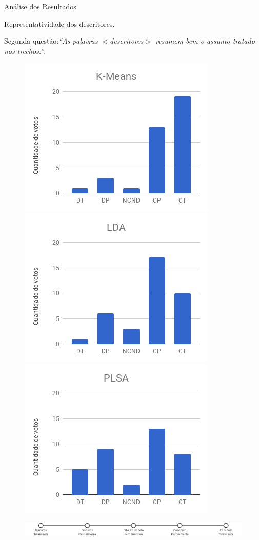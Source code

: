 \documentclass[xcolor=dvipsnames]{beamer}
\begin{document}
\begin{frame}{Análise dos Resultados}

	Representatividade dos descritores.

	Segunda questão:\textit{``As palavras \textit{$<$descritores$>$} resumem bem o assunto tratado nos trechos.''}.
\begin{figure}[!h] \centering     %

	\includegraphics[width=.31\textwidth]{images/figuras-experimento/Q2-KMeans.png}
	\includegraphics[width=.31\textwidth]{images/figuras-experimento/Q2-LDA.png}
	\includegraphics[width=.31\textwidth]{images/figuras-experimento/Q2-PLSA.png}
\end{figure}

\begin{figure}[!h] \centering     %
	\includegraphics[width=.9\textwidth]{images/likert.png}
\end{figure}

\end{frame}
\end{document}
